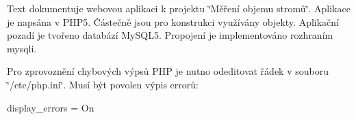 Text dokumentuje webovou aplikaci k projektu \char`\"{}Měření objemu stromů\char`\"{}. Aplikace je napsána v PHP5. Částečně jsou pro konstrukci využívány objekty. Aplikační pozadí je tvořeno databází MySQL5. Propojení je implementováno rozhraním mysqli.

Pro zprovoznění chybových výpsů PHP je nutno odeditovat řádek v souboru \char`\"{}/etc/php.ini\char`\"{}. Musí být povolen výpis errorů: \par
 display\_\-errors = On 